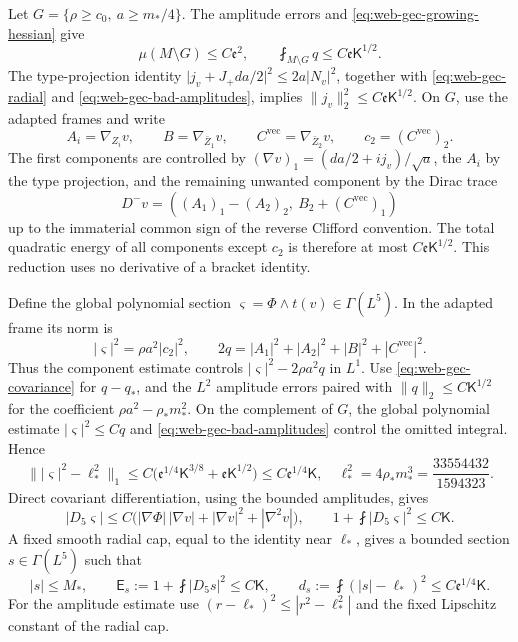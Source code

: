 Let \(G=\{\rho\ge c_0,\ a\ge m_*/4\}\).  The amplitude errors and
\eqref{eq:web-gec-growing-hessian} give
\begin{equation}
 \mu(M\setminus G)\le C\mathfrak e^2,\qquad
 \fint_{M\setminus G}q\le C\mathfrak e\mathsf K^{1/2}.
 \label{eq:web-gec-bad-amplitudes}
\end{equation}
The type-projection identity
\(\lvert j_v+J_+da/2\rvert^2\le2a|N_v|^2\), together with
\eqref{eq:web-gec-radial} and \eqref{eq:web-gec-bad-amplitudes}, implies
\(\|j_v\|_2^2\le C\mathfrak e\mathsf K^{1/2}\).
On \(G\), use the adapted frames and write
\[
 A_i=\nabla_{Z_i}v,\qquad B=\nabla_{\bar Z_1}v,\qquad
 C^{\mathrm{vec}}=\nabla_{\bar Z_2}v,\qquad
 c_2=(C^{\mathrm{vec}})_2.
\]
The first components are controlled by
\((\nabla v)_1=(da/2+ij_v)/\sqrt a\), the \(A_i\) by the type
projection, and the remaining unwanted component by the Dirac trace
\[
 D^-v=((A_1)_1-(A_2)_2,\ B_2+(C^{\mathrm{vec}})_1)
\]
up to the immaterial common sign of the reverse Clifford convention.
The total quadratic energy of all components except \(c_2\) is therefore
at most \(C\mathfrak e\mathsf K^{1/2}\).  This reduction uses no
derivative of a bracket identity.

Define the global polynomial section
\(\varsigma=\Phi\wedge t(v)\in\Gamma(L^5)\).
In the adapted frame its norm is
\[
 |\varsigma|^2=\rho a^2|c_2|^2,\qquad
 2q=|A_1|^2+|A_2|^2+|B|^2+|C^{\mathrm{vec}}|^2.
\]
Thus the component estimate controls
\(|\varsigma|^2-2\rho a^2q\) in \(L^1\).  Use
\eqref{eq:web-gec-covariance} for \(q-q_*\), and the \(L^2\) amplitude
errors paired with \(\|q\|_2\le C\mathsf K^{1/2}\) for the coefficient
\(\rho a^2-\rho_*m_*^2\).  On the complement of \(G\), the global
polynomial estimate \(|\varsigma|^2\le Cq\) and
\eqref{eq:web-gec-bad-amplitudes} control the omitted integral.  Hence
\begin{equation}
 \bigl\||\varsigma|^2-\ell_*^2\bigr\|_1
 \le C\bigl(\mathfrak e^{1/4}\mathsf K^{3/8}
                  +\mathfrak e\mathsf K^{1/2}\bigr)
 \le C\mathfrak e^{1/4}\mathsf K,
 \quad
 \ell_*^2=4\rho_*m_*^3=\frac{33554432}{1594323}.
 \label{eq:web-gec-polynomial-mass}
\end{equation}
Direct covariant differentiation, using the bounded amplitudes, gives
\[
 |D_5\varsigma|\le C\bigl(|\nabla\Phi|\,|\nabla v|
                        +|\nabla v|^2+|\nabla^2v|\bigr),
 \qquad 1+\fint|D_5\varsigma|^2\le C\mathsf K.
\]
A fixed smooth radial cap, equal to the identity near \(\ell_*\), gives
a bounded section \(s\in\Gamma(L^5)\) such that
\begin{equation}
 |s|\le M_*,\qquad
 \mathsf E_s:=1+\fint|D_5s|^2\le C\mathsf K,\qquad
 d_s:=\fint(|s|-\ell_*)^2\le C\mathfrak e^{1/4}\mathsf K.
 \label{eq:web-gec-capped-section}
\end{equation}
For the amplitude estimate use
\((r-\ell_*)^2\le|r^2-\ell_*^2|\) and the fixed Lipschitz constant
of the radial cap.

